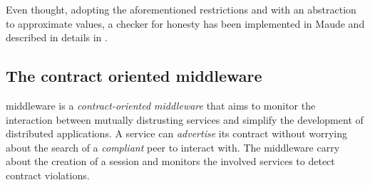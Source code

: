 Even thought, adopting the aforementioned restrictions and with an abstraction
to approximate values, a checker for honesty has been  implemented
in Maude \cite{Maude01} and described in details in \cite{verifiable}.


\subsection{The contract oriented middleware}

\coco middleware  is a \textit{contract-oriented middleware} \cite{CO2middleware}
that aims to monitor the interaction between mutually distrusting
services and simplify the development of distributed applications.
%
A service can \textit{advertise} its contract without worrying about
the search of a \textit{compliant} peer to interact with. The
middleware carry about the creation of a session and monitors the
involved services to detect contract violations.



